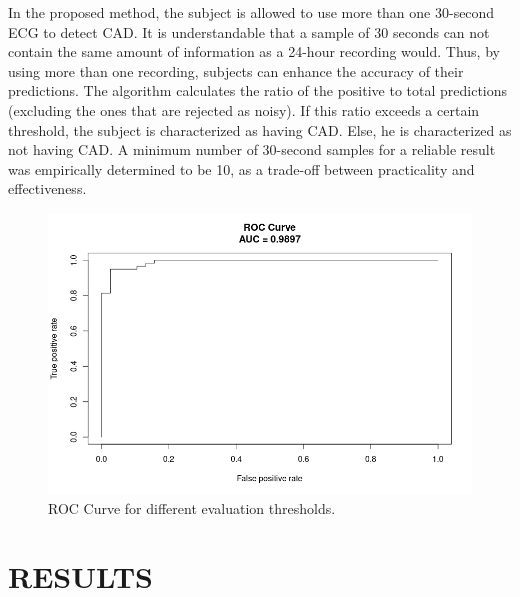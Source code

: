 In the proposed method, the subject is allowed to use more than one 30-second ECG to detect CAD. It is understandable that a sample of 30 seconds can not contain the same amount of information as a 24-hour recording would. Thus, by using more than one recording, subjects can enhance the accuracy of their predictions. The algorithm calculates the ratio of the positive to total predictions (excluding the ones that are rejected as noisy). If this ratio exceeds a certain threshold, the subject is characterized as having CAD. Else, he is characterized as not having CAD. A minimum number of 30-second samples for a reliable result was empirically determined to be 10, as a trade-off between practicality and effectiveness.

\begin{figure}[htb]

\centering
\includegraphics[width=0.9\columnwidth]{roc_black_white.png}

\caption{ROC Curve for different evaluation thresholds.}
\label{fig:roc}
%
\end{figure}



\section{RESULTS}
\label{sec:results}

